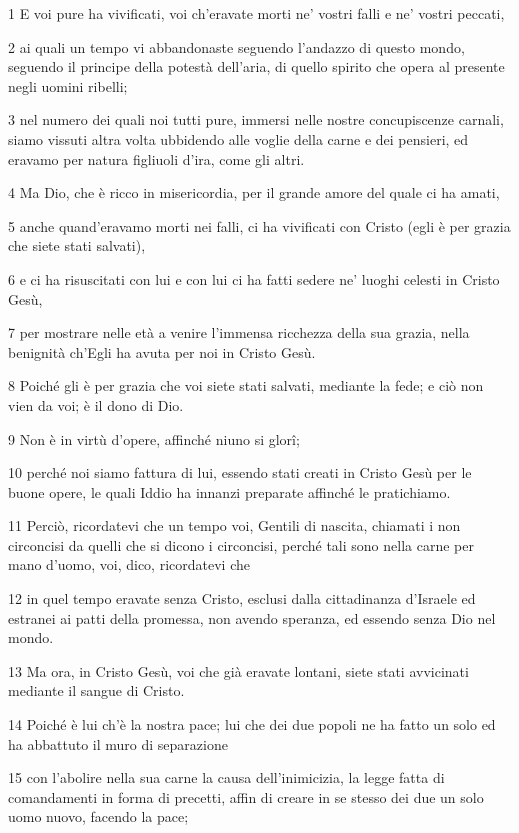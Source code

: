 \par 1 E voi pure ha vivificati, voi ch'eravate morti ne' vostri falli e ne' vostri peccati,
\par 2 ai quali un tempo vi abbandonaste seguendo l'andazzo di questo mondo, seguendo il principe della potestà dell'aria, di quello spirito che opera al presente negli uomini ribelli;
\par 3 nel numero dei quali noi tutti pure, immersi nelle nostre concupiscenze carnali, siamo vissuti altra volta ubbidendo alle voglie della carne e dei pensieri, ed eravamo per natura figliuoli d'ira, come gli altri.
\par 4 Ma Dio, che è ricco in misericordia, per il grande amore del quale ci ha amati,
\par 5 anche quand'eravamo morti nei falli, ci ha vivificati con Cristo (egli è per grazia che siete stati salvati),
\par 6 e ci ha risuscitati con lui e con lui ci ha fatti sedere ne' luoghi celesti in Cristo Gesù,
\par 7 per mostrare nelle età a venire l'immensa ricchezza della sua grazia, nella benignità ch'Egli ha avuta per noi in Cristo Gesù.
\par 8 Poiché gli è per grazia che voi siete stati salvati, mediante la fede; e ciò non vien da voi; è il dono di Dio.
\par 9 Non è in virtù d'opere, affinché niuno si glorî;
\par 10 perché noi siamo fattura di lui, essendo stati creati in Cristo Gesù per le buone opere, le quali Iddio ha innanzi preparate affinché le pratichiamo.
\par 11 Perciò, ricordatevi che un tempo voi, Gentili di nascita, chiamati i non circoncisi da quelli che si dicono i circoncisi, perché tali sono nella carne per mano d'uomo, voi, dico, ricordatevi che
\par 12 in quel tempo eravate senza Cristo, esclusi dalla cittadinanza d'Israele ed estranei ai patti della promessa, non avendo speranza, ed essendo senza Dio nel mondo.
\par 13 Ma ora, in Cristo Gesù, voi che già eravate lontani, siete stati avvicinati mediante il sangue di Cristo.
\par 14 Poiché è lui ch'è la nostra pace; lui che dei due popoli ne ha fatto un solo ed ha abbattuto il muro di separazione
\par 15 con l'abolire nella sua carne la causa dell'inimicizia, la legge fatta di comandamenti in forma di precetti, affin di creare in se stesso dei due un solo uomo nuovo, facendo la pace;
